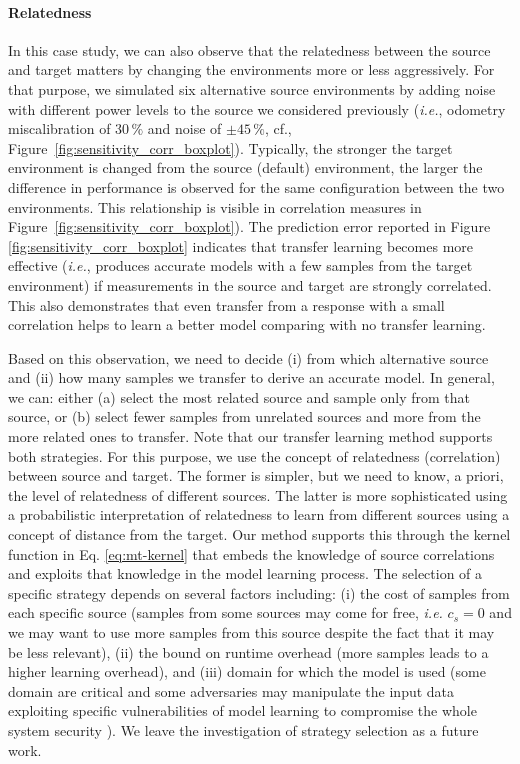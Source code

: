 \paragraph*{Relatedness}
In this case study, we can also observe that the relatedness between the source and target matters by changing the environments more or less aggressively.
For that purpose, we simulated six alternative source environments by adding noise with different power levels to the source we considered previously (\emph{i.e.}, odometry miscalibration of $30\,\%$ and noise of $\pm45\,\%$, cf., Figure~\ref{fig:sensitivity_corr_boxplot}). Typically,
the stronger the target environment is changed from the source (default) environment, the larger
the difference in performance is observed for the same configuration between the
two environments. This relationship is visible in correlation measures in
Figure~\ref{fig:sensitivity_corr_boxplot}). The prediction error reported in Figure \ref{fig:sensitivity_corr_boxplot} indicates that transfer learning becomes more effective
(\emph{i.e.}, produces accurate models with a few samples from the target environment)
if measurements in the source and target are strongly correlated. This also demonstrates that even transfer from a response with a small correlation helps to learn a better model comparing with no transfer learning.

Based on this observation, we need to decide (i) from which alternative source and (ii) how many samples we transfer to derive an accurate model. In general, we can: either (a) select the most related source and sample only from that source, or (b) select fewer samples from unrelated sources and more from the more related ones to transfer.
Note that our transfer learning method supports both strategies. For this purpose, we use the concept of relatedness (correlation) between source and target. The former is simpler, but we need to know, a priori, the level of relatedness of different sources. The latter is more sophisticated using a probabilistic interpretation of relatedness to learn from different sources using a concept of distance from the target. Our method supports this through the kernel function in Eq. \ref{eq:mt-kernel} that embeds the knowledge of source correlations and exploits that knowledge in the model learning process. The selection of a specific strategy depends on several factors including: (i) the cost of samples from each specific source (samples from some sources may come for free, \emph{i.e.} $c_s=0$ and we may want to use more samples from this source despite the fact that it may be less relevant), (ii) the bound on runtime overhead (more samples leads to a higher learning overhead), and (iii) domain for which the model is used (some domain are critical and some adversaries may manipulate the input data exploiting specific vulnerabilities of model learning to compromise the whole system security \cite{papernot2016towards}). We leave the investigation of strategy selection as a future work.



